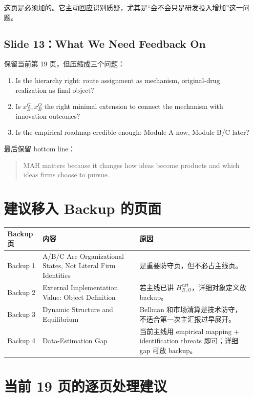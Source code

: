 \documentclass[12pt]{ctexart}
\begin{document}
这页是必须加的。它主动回应识别质疑，尤其是“会不会只是研发投入增加”这一问题。

\subsection{Slide 13：What We Need Feedback On}

保留当前第 19 页，但压缩成三个问题：

\begin{enumerate}
    \item Is the hierarchy right: route assignment as mechanism, original-drug realization as final object?
    \item Is $x_B^G,x_B^O$ the right minimal extension to connect the mechanism with innovation outcomes?
    \item Is the empirical roadmap credible enough: Module A now, Module B/C later?
\end{enumerate}

最后保留 bottom line：
\begin{quote}
MAH matters because it changes how ideas become products and which ideas firms choose to pursue.
\end{quote}

\section{建议移入 Backup 的页面}

\begin{center}
\begin{tabularx}{0.95\textwidth}{L{0.2\textwidth}Y Y}
\toprule
Backup 页 & 内容 & 原因 \\
\midrule
Backup 1 & A/B/C Are Organizational States, Not Literal Firm Identities & 是重要防守页，但不必占主线页。 \\
Backup 2 & External Implementation Value: Object Definition & 若主线已讲 $H^{ext}_{B,O}$，详细对象定义放 backup。 \\
Backup 3 & Dynamic Structure and Equilibrium & Bellman 和市场清算是技术防守，不适合第一次主汇报过早展开。 \\
Backup 4 & Data-Estimation Gap & 当前主线用 empirical mapping + identification threats 即可；详细 gap 可放 backup。 \\
\bottomrule
\end{tabularx}
\end{center}

\section{当前 19 页的逐页处理建议}
\end{document}
